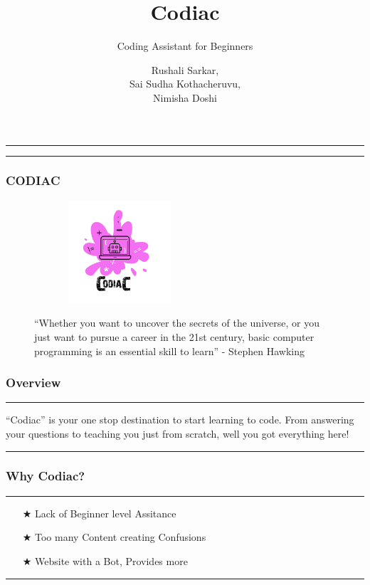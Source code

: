 \documentclass[14pt]{beamer}
\title[Codiac]{Codiac}
\subtitle[Coding Assitant]{Coding Assistant for Beginners}
\author[Team 2]{Rushali Sarkar, \\ Sai Sudha Kothacheruvu, \\ Nimisha Doshi}
\begin{document}
\begin{frame}
    \noindent
    {\color{pink} \rule{\linewidth}{0.7mm} }
    \titlepage
    \noindent
    {\color{pink} \rule{\linewidth}{0.7mm} }
\end{frame}


\begin{frame}
    \frametitle{CODIAC}
    \begin{figure}[htbp]
        \centerline{\includegraphics[width=2.5in, height=1.5in]{./logos/logo.jpeg}}
        \begin{spacing}{0.25}
        {\small 
        ``Whether you want to uncover the secrets of the universe, 
        or you just want to pursue a career in the 21st century, 
        basic computer programming is an essential skill to learn'' 
        \linebreak - Stephen Hawking}
        \end{spacing}
    \end{figure}
\end{frame}


\begin{frame}
    \frametitle{Overview}
    \noindent
    {\color{pink} \rule{\linewidth}{0.7mm} }
    ``Codiac'' is your one stop destination to start learning to code. From answering your questions to teaching you just from scratch, well you got everything here!
    \noindent
    {\color{pink} \rule{\linewidth}{0.7mm} }
\end{frame}

\begin{frame}
    \frametitle{Why Codiac?}
    \noindent
    {\color{pink} \rule{\linewidth}{0.7mm} }
    \begin{itemize}
    \item [$\bigstar$] Lack of Beginner level Assitance \\
        \pause
    \item [$\bigstar$] Too many Content creating Confusions \\
        \pause
   \item [$\bigstar$] Website with a Bot, Provides more \\
    \end{itemize}
    \noindent
     {\color{pink} \rule{\linewidth}{0.7mm}}
\end{frame}
\end{document}
